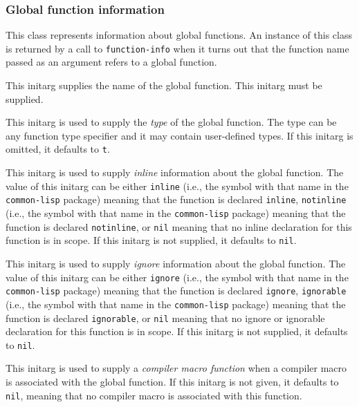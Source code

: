 \subsubsection{Global function information}


This class represents information about global functions.  An instance
of this class is returned by a call to \texttt{function-info} when it
turns out that the function name passed as an argument refers to a
global function.


This initarg supplies the name of the global function.  This initarg
must be supplied.


This initarg is used to supply the \emph{type} of the global function.
The type can be any function type specifier and it may contain
user-defined types.  If this initarg is omitted, it defaults to
\texttt{t}.


This initarg is used to supply \emph{inline} information about the
global function.  The value of this initarg can be either
\texttt{inline} (i.e., the symbol with that name in the
\texttt{common-lisp} package) meaning that the function is declared
\texttt{inline}, \texttt{notinline} (i.e., the symbol with that name
in the \texttt{common-lisp} package) meaning that the function is
declared \texttt{notinline}, or \texttt{nil} meaning that no inline
declaration for this function is in scope.  If this initarg is not
supplied, it defaults to \texttt{nil}.


This initarg is used to supply \emph{ignore} information about the
global function.  The value of this initarg can be either
\texttt{ignore} (i.e., the symbol with that name in the
\texttt{common-lisp} package) meaning that the function is declared
\texttt{ignore}, \texttt{ignorable} (i.e., the symbol with that name
in the \texttt{common-lisp} package) meaning that the function is
declared \texttt{ignorable}, or \texttt{nil} meaning that no ignore or
ignorable declaration for this function is in scope.  If this initarg
is not supplied, it defaults to \texttt{nil}.


This initarg is used to supply a \emph{compiler macro function} when
a compiler macro is associated with the global function.  If this
initarg is not given, it defaults to \texttt{nil}, meaning that no
compiler macro is associated with this function. 

